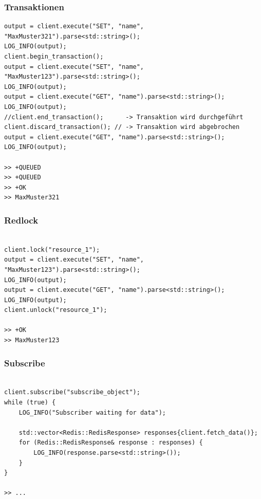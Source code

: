 \documentclass[12pt, letterpaper]{article}
\newenvironment{code}{\captionsetup{type=listing}}{}
\begin{document}
\subsubsection{Transaktionen}
\begin{code}
\begin{verbatim}
output = client.execute("SET", "name", "MaxMuster321").parse<std::string>();
LOG_INFO(output);
client.begin_transaction();
output = client.execute("SET", "name", "MaxMuster123").parse<std::string>();
LOG_INFO(output);
output = client.execute("GET", "name").parse<std::string>();
LOG_INFO(output);
//client.end_transaction();      -> Transaktion wird durchgeführt
client.discard_transaction(); // -> Transaktion wird abgebrochen
output = client.execute("GET", "name").parse<std::string>();
LOG_INFO(output);
    
>> +QUEUED
>> +QUEUED
>> +OK
>> MaxMuster321
\end{verbatim}  
\end{code}

\subsubsection{Redlock}
\begin{code}
\begin{verbatim}

client.lock("resource_1");
output = client.execute("SET", "name", "MaxMuster123").parse<std::string>();
LOG_INFO(output);
output = client.execute("GET", "name").parse<std::string>();
LOG_INFO(output);
client.unlock("resource_1");

>> +OK
>> MaxMuster123
\end{verbatim}  
\end{code}

\subsubsection{Subscribe}
\begin{code}
\begin{verbatim}

client.subscribe("subscribe_object");
while (true) {
    LOG_INFO("Subscriber waiting for data");
        
    std::vector<Redis::RedisResponse> responses{client.fetch_data()};
    for (Redis::RedisResponse& response : responses) {
        LOG_INFO(response.parse<std::string>());
    }
}

>> ...
\end{verbatim}  
\end{code}
\end{document}

